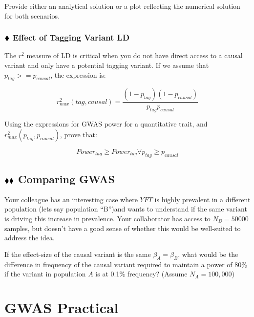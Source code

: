 \documentclass{pset}
\begin{document}
Provide either an analytical solution or a plot reflecting the numerical solution for both scenarios. 



\subsubsection*{$\mathbin{\blacklozenge}$  Effect of Tagging Variant LD}

The $r^2$ measure of LD is critical when you do not have direct access to a causal variant and only have a potential tagging variant. If we assume that $p_{tag} >= p_{causal}$, the expression is: 

$$r^2_{max}(tag, causal) = \frac{(1 - p_{tag})(1 - p_{causal})}{p_{tag}p_{causal}}$$

Using the expressions for GWAS power for a quantitative trait, and $r^2_{max}(p_{tag}, p_{causal})$, prove that:

$$Power_{tag} \geq Power_{tag} \forall p_{tag} \geq p_{causal}$$

\subsection*{$\mathbin{\blacklozenge}\mathbin{\blacklozenge}$ Comparing GWAS}

Your colleague has an interesting case where $YFT$ is highly prevalent in a different population (lets say population ``B'')and wants to understand if the same variant is driving this increase in prevalence. Your collaborator has access to $N_B=50000$ samples, but doesn't have a good sense of whether this would be well-suited to address the idea.

If the effect-size of the causal variant is the same $\beta_A = \beta_B$, what would be the difference in frequency of the causal variant required to maintain a power of 80\% if the variant in population $A$ is at 0.1\% frequency? (Assume $N_A = 100,000$)  


\section*{GWAS Practical}

\subsection*{}

\subsection*{}

\subsection*{}
\end{document}
